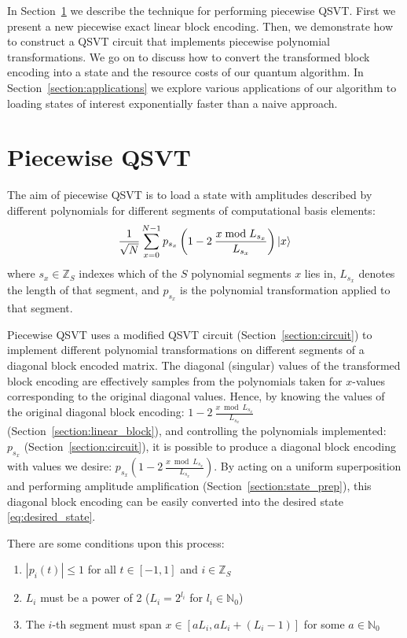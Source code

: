 \documentclass[aps,prx,twocolumn,floatfix,10pt,amssymb,amsfont,amsmath,superscriptaddress,float,nofootinbib,longbibliography,nobalancelastpage]{revtex4-2}
\theoremstyle{empty}
\begin{document}
In Section~\ref{section:piecewise_qsvt} we describe the technique for performing piecewise QSVT. First we present a new piecewise exact linear block encoding. Then, we demonstrate how to construct a QSVT circuit that implements piecewise polynomial transformations. We go on to discuss how to convert the transformed block encoding into a state and the resource costs of our quantum algorithm. In Section~\ref{section:applications} we explore various applications of our algorithm to loading states of interest exponentially faster than a naive approach. 


\section{Piecewise QSVT}
\label{section:piecewise_qsvt}
The aim of piecewise QSVT is to load a state with amplitudes described by different polynomials for different segments of computational basis elements:
\begin{equation}
    \frac{1}{\sqrt{N}}\sum_{x=0}^{N-1} p_{s_x}\left( 1 - 2\>\frac{x \bmod L_{s_x}}{L_{s_x}}\right)  \ket{x}
    \label{eq:desired_state}
\end{equation}
where $s_x \in \mathbb{Z}_S$ indexes which of the $S$ polynomial segments $x$ lies in, $L_{s_x}$ denotes the length of that segment, and $p_{s_x}$ is the polynomial transformation applied to that segment.

Piecewise QSVT uses a modified QSVT circuit (Section~\ref{section:circuit}) to implement different polynomial transformations on different segments of a diagonal block encoded matrix. The diagonal (singular) values of the transformed block encoding are effectively samples from the polynomials taken for $x$-values corresponding to the original diagonal values. Hence, by knowing the values of the original diagonal block encoding: $1 - 2\>\frac{x \bmod L_{s_x}}{L_{s_x}}$ (Section~\ref{section:linear_block}), and controlling the polynomials implemented: $p_{s_x}$ (Section~\ref{section:circuit}), it is possible to produce a diagonal block encoding with values we desire: $p_{s_x}\left( 1 - 2\>\frac{x \bmod L_{s_x}}{L_{s_x}}\right) $. By acting on a uniform superposition and performing amplitude amplification (Section~\ref{section:state_prep}), this diagonal block encoding can be easily converted into the desired state \eqref{eq:desired_state}.


There are some conditions upon this process:
\begin{enumerate}[{(1)}]
    \item $|p_i(t)| \leq 1$ for all $t \in [-1,1]$ and $i \in \mathbb{Z}_S$
    \item $L_i$ must be a power of 2 ($L_i = 2^{l_i}$ for $l_i \in \mathbb{N}_0$)
    \item The $i$-th segment must span $x \in [aL_i, aL_i + (L_i - 1)]$ for some $a \in \mathbb{N}_0$
\end{enumerate}
\end{document}
